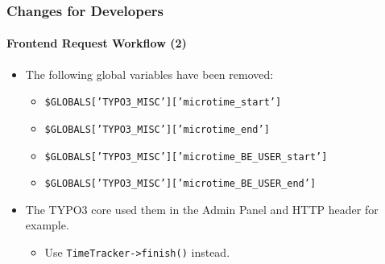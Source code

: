 \begin{frame}[fragile]
	\frametitle{Changes for Developers}
	\framesubtitle{Frontend Request Workflow (2)}

	\lstset{basicstyle=\smaller\ttfamily}

	\begin{itemize}
		\item The following global variables have been removed:

			\begin{itemize}
				\item \texttt{\$GLOBALS['TYPO3\_MISC']['microtime\_start']}
				\item \texttt{\$GLOBALS['TYPO3\_MISC']['microtime\_end']}
				\item \texttt{\$GLOBALS['TYPO3\_MISC']['microtime\_BE\_USER\_start']}
				\item \texttt{\$GLOBALS['TYPO3\_MISC']['microtime\_BE\_USER\_end']}
			\end{itemize}

		\item The TYPO3 core used them in the Admin Panel and HTTP header for example.

			\begin{itemize}\smaller
				\item[\ding{228}] Use \texttt{TimeTracker->finish()} instead.
			\end{itemize}\normalsize

	\end{itemize}

\end{frame}



